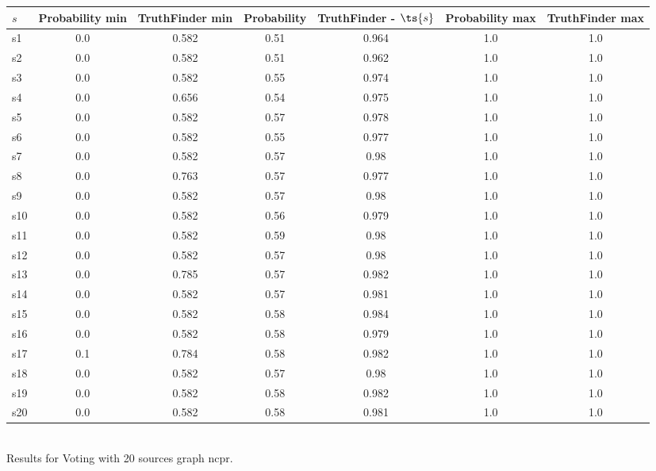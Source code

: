 \documentclass{article}
\begin{document}
\noindent\begin{tabular}{|l|c|c|c|c|c|c|}
\hline
$s$& Probability min & TruthFinder min & Probability & TruthFinder - $\ts{s}$ & Probability max & TruthFinder max\\
\hline
s1 &0.0 & 0.582 & 0.51 & 0.964 & 1.0 & 1.0\\
\hline
s2 &0.0 & 0.582 & 0.51 & 0.962 & 1.0 & 1.0\\
\hline
s3 &0.0 & 0.582 & 0.55 & 0.974 & 1.0 & 1.0\\
\hline
s4 &0.0 & 0.656 & 0.54 & 0.975 & 1.0 & 1.0\\
\hline
s5 &0.0 & 0.582 & 0.57 & 0.978 & 1.0 & 1.0\\
\hline
s6 &0.0 & 0.582 & 0.55 & 0.977 & 1.0 & 1.0\\
\hline
s7 &0.0 & 0.582 & 0.57 & 0.98 & 1.0 & 1.0\\
\hline
s8 &0.0 & 0.763 & 0.57 & 0.977 & 1.0 & 1.0\\
\hline
s9 &0.0 & 0.582 & 0.57 & 0.98 & 1.0 & 1.0\\
\hline
s10 &0.0 & 0.582 & 0.56 & 0.979 & 1.0 & 1.0\\
\hline
s11 &0.0 & 0.582 & 0.59 & 0.98 & 1.0 & 1.0\\
\hline
s12 &0.0 & 0.582 & 0.57 & 0.98 & 1.0 & 1.0\\
\hline
s13 &0.0 & 0.785 & 0.57 & 0.982 & 1.0 & 1.0\\
\hline
s14 &0.0 & 0.582 & 0.57 & 0.981 & 1.0 & 1.0\\
\hline
s15 &0.0 & 0.582 & 0.58 & 0.984 & 1.0 & 1.0\\
\hline
s16 &0.0 & 0.582 & 0.58 & 0.979 & 1.0 & 1.0\\
\hline
s17 &0.1 & 0.784 & 0.58 & 0.982 & 1.0 & 1.0\\
\hline
s18 &0.0 & 0.582 & 0.57 & 0.98 & 1.0 & 1.0\\
\hline
s19 &0.0 & 0.582 & 0.58 & 0.982 & 1.0 & 1.0\\
\hline
s20 &0.0 & 0.582 & 0.58 & 0.981 & 1.0 & 1.0\\
\hline
\end{tabular}\\

\noindent Results for Voting with 20 sources graph ncpr.
\end{document}
